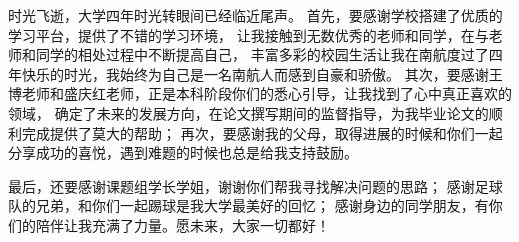 
\begin{acknowledgements}

    时光飞逝，大学四年时光转眼间已经临近尾声。
    首先，要感谢学校搭建了优质的学习平台，提供了不错的学习环境，
    让我接触到无数优秀的老师和同学，在与老师和同学的相处过程中不断提高自己，
    丰富多彩的校园生活让我在南航度过了四年快乐的时光，我始终为自己是一名南航人而感到自豪和骄傲。
    其次，要感谢王博老师和盛庆红老师，正是本科阶段你们的悉心引导，让我找到了心中真正喜欢的领域，
    确定了未来的发展方向，在论文撰写期间的监督指导，为我毕业论文的顺利完成提供了莫大的帮助；
    再次，要感谢我的父母，取得进展的时候和你们一起分享成功的喜悦，遇到难题的时候也总是给我支持鼓励。

    最后，还要感谢课题组学长学姐，谢谢你们帮我寻找解决问题的思路；
    感谢足球队的兄弟，和你们一起踢球是我大学最美好的回忆；
    感谢身边的同学朋友，有你们的陪伴让我充满了力量。愿未来，大家一切都好！

\end{acknowledgements}
